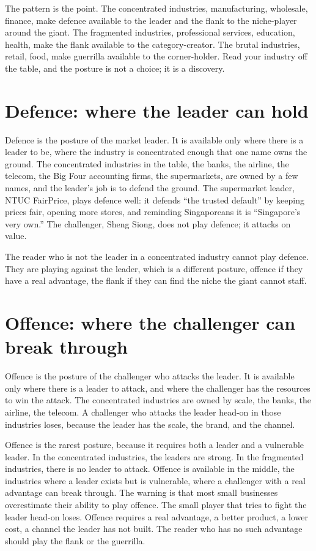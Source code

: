 \documentclass[10pt,twoside,openany]{memoir}
\newcommand{\needspacehead}{\needspace{4\baselineskip}}
\let\oldsection\section
\renewcommand{\section}{\needspacehead\oldsection}
\begin{document}
{{The pattern is the point. The concentrated industries, manufacturing,
wholesale, finance, make defence available to the leader and the flank
to the niche-player around the giant. The fragmented industries,
professional services, education, health, make the flank available to
the category-creator. The brutal industries, retail, food, make
guerrilla available to the corner-holder. Read your industry off the
table, and the posture is not a choice; it is a discovery.

\section{Defence: where the leader can
hold}\label{defence-where-the-leader-can-hold}

Defence is the posture of the market leader. It is available only where
there is a leader to be, where the industry is concentrated enough that
one name owns the ground. The concentrated industries in the table, the
banks, the airline, the telecom, the Big Four accounting firms, the
supermarkets, are owned by a few names, and the leader's job is to
defend the ground. The supermarket leader, NTUC FairPrice, plays defence
well: it defends ``the trusted default'' by keeping prices fair, opening
more stores, and reminding Singaporeans it is ``Singapore's very own.''
The challenger, Sheng Siong, does not play defence; it attacks on value.

The reader who is not the leader in a concentrated industry cannot play
defence. They are playing against the leader, which is a different
posture, offence if they have a real advantage, the flank if they can
find the niche the giant cannot staff.

\section{Offence: where the challenger can break
through}\label{offence-where-the-challenger-can-break-through}

Offence is the posture of the challenger who attacks the leader. It is
available only where there is a leader to attack, and where the
challenger has the resources to win the attack. The concentrated
industries are owned by scale, the banks, the airline, the telecom. A
challenger who attacks the leader head-on in those industries loses,
because the leader has the scale, the brand, and the channel.

Offence is the rarest posture, because it requires both a leader and a
vulnerable leader. In the concentrated industries, the leaders are
strong. In the fragmented industries, there is no leader to attack.
Offence is available in the middle, the industries where a leader exists
but is vulnerable, where a challenger with a real advantage can break
through. The warning is that most small businesses overestimate their
ability to play offence. The small player that tries to fight the leader
head-on loses. Offence requires a real advantage, a better product, a
lower cost, a channel the leader has not built. The reader who has no
such advantage should play the flank or the guerrilla.

}}
\end{document}
